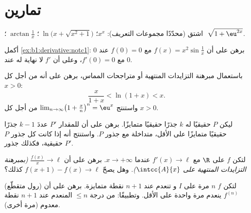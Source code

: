 \section{تمارين}

\begin{exercise}[$\star$]\label{exo:b1:derivative:1}
اشتق (محدّدًا مجموعات التعريف): $x^x$؛
$\;\ln\bigl(x + \sqrt{x^2+1}\bigr)$؛ $\;\arctan\frac{1}{x}$؛
$\;\sqrt{1 + \eu^{2x}}$.
\end{exercise}

\begin{exercise}[$\star$]\label{exo:b1:derivative:2}
أكمل \cref{ex:b1:derivative:notc1}: برهن على أن $f(x) = x^2
\sin\frac1x$ مع $f(0) = 0$  عند $0$ مع $f'(0) = 0$،
وعلى أن $f'$ لا نهاية له عند $0$.
\end{exercise}

\begin{exercise}[$\star$]\label{exo:b1:derivative:3}
باستعمال مبرهنة التزايدات المنتهية أو متراجحات المماس، برهن على أنه
من أجل كل $x > 0$:
\[
\frac{x}{1 + x} < \ln(1 + x) < x .
\]
واستنتج $\lim_{n\to\infty} \bigl(1 + \frac xn\bigr)^n = \eu^x$ من أجل
كل $x > 0$.
\end{exercise}

\begin{exercise}[$\star$]\label{exo:b1:derivative:4}
ليكن $P$  حقيقيًا له $k$ جذرًا حقيقيًا متمايزًا. برهن على أن
للمقدار $P'$ عددَ $k - 1$ جذرًا حقيقيًا متمايزًا على الأقل، متداخلة مع جذور
$P$. واستنتج أنه إذا كانت كل جذور $P$ حقيقية، فكذلك جذور $P'$.
\end{exercise}

\begin{exercise}[$\star\star$]\label{exo:b1:derivative:5}
لتكن $f$  على $\R$ مع $f' (x)\to \ell$ عندما $x \to
+\infty$. برهن على أن $\frac{f(x)}{x} \to \ell$ \emph{(بمبرهنة التزايدات
المنتهية على $\intcc{A}{x}$)}. وهل يصحّ $f(x+1) - f(x) \to \ell$ كذلك؟
\end{exercise}

\begin{exercise}[$\star\star$]\label{exo:b1:derivative:6}
(رول متقطّع) لتكن $f$  $n$ مرة على $I$ و
تنعدم عند $n + 1$ نقطة متمايزة. برهن على أن $f^{(n)}$ ينعدم
مرة واحدة على الأقل. وتطبيقًا:  من درجة $\leq n$ المنعدم عند
$n+1$ نقطة معدوم (مرة أخرى).
\end{exercise}

